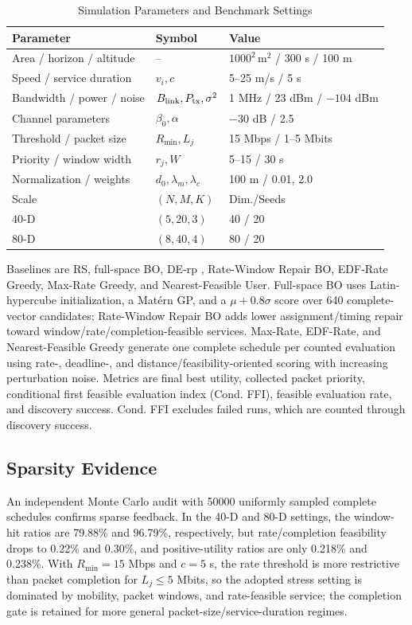 \documentclass[letterpaper,journal]{IEEEtran}
\begin{document}
\begin{table}[!ht]
\caption{Simulation Parameters and Benchmark Settings}
\label{tab:params}
\centering
\footnotesize
\begingroup
\setlength{\tabcolsep}{2.8pt}
\renewcommand{\arraystretch}{1.14}
\begin{tabular*}{\columnwidth}{@{\extracolsep{\fill}}lll@{}}
\toprule
Parameter & Symbol & Value \\
\midrule
Area / horizon / altitude & -- & $1000^2\,\mathrm{m}^2$ / 300 s / 100 m \\
Speed / service duration & $v_i,c$ & 5--25 m/s / 5 s \\
Bandwidth / power / noise & $B_{\rm link},P_{\rm tx},\sigma^2$ & 1 MHz / 23 dBm / $-104$ dBm \\
Channel parameters & $\beta_0,\alpha$ & $-30$ dB / 2.5 \\
Threshold / packet size & $R_{\min},L_j$ & 15 Mbps / 1--5 Mbits \\
Priority / window width & $r_j,W$ & 5--15 / 30 s \\
Normalization / weights & $d_0,\lambda_m,\lambda_c$ & 100 m / 0.01, 2.0 \\
\midrule
Scale & $(N,M,K)$ & Dim./Seeds \\
40-D & $(5,20,3)$ & 40 / 20 \\
80-D & $(8,40,4)$ & 80 / 20 \\
\bottomrule
\end{tabular*}
\endgroup
\end{table}

Baselines are RS, full-space BO, DE-rp \cite{storn1997}, Rate-Window Repair BO, EDF-Rate Greedy, Max-Rate Greedy, and Nearest-Feasible User. Full-space BO uses Latin-hypercube initialization, a Mat\'ern GP, and a $\mu+0.8\sigma$ score over 640 complete-vector candidates; Rate-Window Repair BO adds lower assignment/timing repair toward window/rate/completion-feasible services. Max-Rate, EDF-Rate, and Nearest-Feasible Greedy generate one complete schedule per counted evaluation using rate-, deadline-, and distance/feasibility-oriented scoring with increasing perturbation noise. Metrics are final best utility, collected packet priority, conditional first feasible evaluation index (Cond. FFI), feasible evaluation rate, and discovery success. Cond. FFI excludes failed runs, which are counted through discovery success.

\subsection{Sparsity Evidence}
An independent Monte Carlo audit with 50000 uniformly sampled complete schedules confirms sparse feedback. In the 40-D and 80-D settings, the window-hit ratios are 79.88\% and 96.79\%, respectively, but rate/completion feasibility drops to 0.22\% and 0.30\%, and positive-utility ratios are only 0.218\% and 0.238\%. With $R_{\min}=15$ Mbps and $c=5$ s, the rate threshold is more restrictive than packet completion for $L_j\le 5$ Mbits, so the adopted stress setting is dominated by mobility, packet windows, and rate-feasible service; the completion gate is retained for more general packet-size/service-duration regimes.
\end{document}
